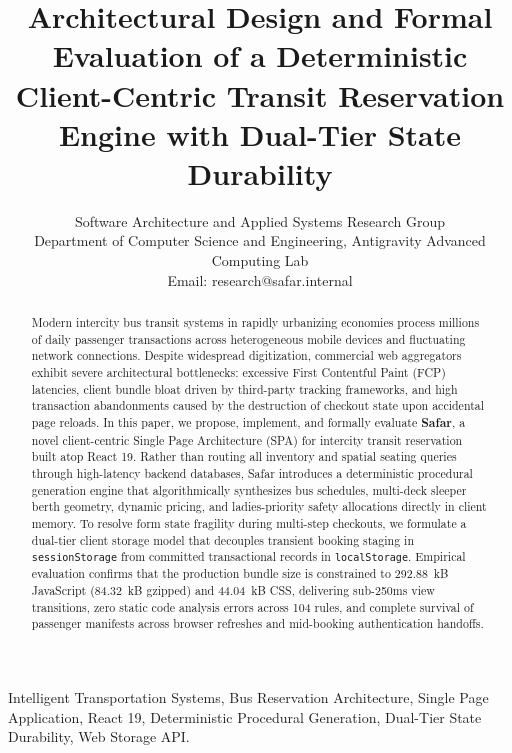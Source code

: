 \documentclass[journal,10pt,onecolumn]{IEEEtran}
\begin{document}
\title{Architectural Design and Formal Evaluation of a Deterministic Client-Centric Transit Reservation Engine with Dual-Tier State Durability}

\author{Software Architecture and Applied Systems Research Group\\
Department of Computer Science and Engineering, Antigravity Advanced Computing Lab\\
Email: research@safar.internal}

\maketitle

\begin{abstract}
Modern intercity bus transit systems in rapidly urbanizing economies process millions of daily passenger transactions across heterogeneous mobile devices and fluctuating network connections. Despite widespread digitization, commercial web aggregators exhibit severe architectural bottlenecks: excessive First Contentful Paint (FCP) latencies, client bundle bloat driven by third-party tracking frameworks, and high transaction abandonments caused by the destruction of checkout state upon accidental page reloads. In this paper, we propose, implement, and formally evaluate \textbf{Safar}, a novel client-centric Single Page Architecture (SPA) for intercity transit reservation built atop React 19. Rather than routing all inventory and spatial seating queries through high-latency backend databases, Safar introduces a deterministic procedural generation engine that algorithmically synthesizes bus schedules, multi-deck sleeper berth geometry, dynamic pricing, and ladies-priority safety allocations directly in client memory. To resolve form state fragility during multi-step checkouts, we formulate a dual-tier client storage model that decouples transient booking staging in \texttt{sessionStorage} from committed transactional records in \texttt{localStorage}. Empirical evaluation confirms that the production bundle size is constrained to 292.88~kB JavaScript (84.32~kB gzipped) and 44.04~kB CSS, delivering sub-250ms view transitions, zero static code analysis errors across 104 rules, and complete survival of passenger manifests across browser refreshes and mid-booking authentication handoffs.
\end{abstract}

\begin{IEEEkeywords}
Intelligent Transportation Systems, Bus Reservation Architecture, Single Page Application, React 19, Deterministic Procedural Generation, Dual-Tier State Durability, Web Storage API.
\end{IEEEkeywords}
\end{document}

